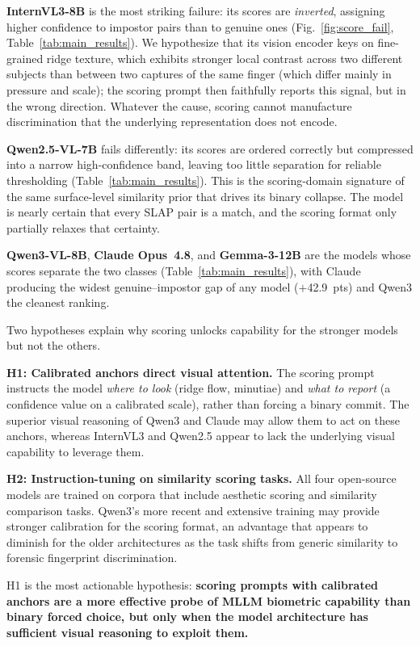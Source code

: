 \documentclass[journal]{IEEEtran}
\begin{document}
\textbf{InternVL3-8B} is the most striking failure: its scores are
\emph{inverted}, assigning higher confidence to impostor pairs than to
genuine ones (Fig.~\ref{fig:score_fail}, Table~\ref{tab:main_results}).
We hypothesize that its vision encoder keys on fine-grained ridge texture,
which exhibits stronger local contrast across two different subjects than
between two captures of the same finger (which differ mainly in pressure
and scale); the scoring prompt then faithfully reports this signal, but
in the wrong direction.
Whatever the cause, scoring cannot manufacture discrimination that the
underlying representation does not encode.

\textbf{Qwen2.5-VL-7B} fails differently: its scores are ordered
correctly but compressed into a narrow high-confidence band, leaving too
little separation for reliable thresholding (Table~\ref{tab:main_results}).
This is the scoring-domain signature of the same surface-level similarity
prior that drives its binary collapse. The model is nearly certain that
every SLAP pair is a match, and the scoring format only partially relaxes
that certainty.

\textbf{Qwen3-VL-8B}, \textbf{Claude Opus~4.8}, and \textbf{Gemma-3-12B}
are the models whose scores separate the two classes
(Table~\ref{tab:main_results}), with Claude producing the widest
genuine--impostor gap of any model ($+$42.9~pts) and Qwen3 the cleanest
ranking.

Two hypotheses explain why scoring unlocks capability for the stronger
models but not the others.

\textbf{H1: Calibrated anchors direct visual attention.}
The scoring prompt instructs the model \emph{where to look}
(ridge flow, minutiae) and \emph{what to report} (a confidence value on
a calibrated scale), rather than forcing a binary commit.
The superior visual reasoning of Qwen3 and Claude may allow them to act on
these anchors, whereas InternVL3 and Qwen2.5 appear to lack the underlying
visual capability to leverage them.

\textbf{H2: Instruction-tuning on similarity scoring tasks.}
All four open-source models are trained on corpora that include aesthetic
scoring and similarity comparison tasks.
Qwen3's more recent and extensive training may provide stronger calibration
for the scoring format, an advantage that appears to diminish for the older
architectures as the task shifts from generic similarity to forensic
fingerprint discrimination.

H1 is the most actionable hypothesis: \textbf{scoring prompts with
calibrated anchors are a more effective probe of MLLM biometric
capability than binary forced choice, but only when the model
architecture has sufficient visual reasoning to exploit them.}
\end{document}
